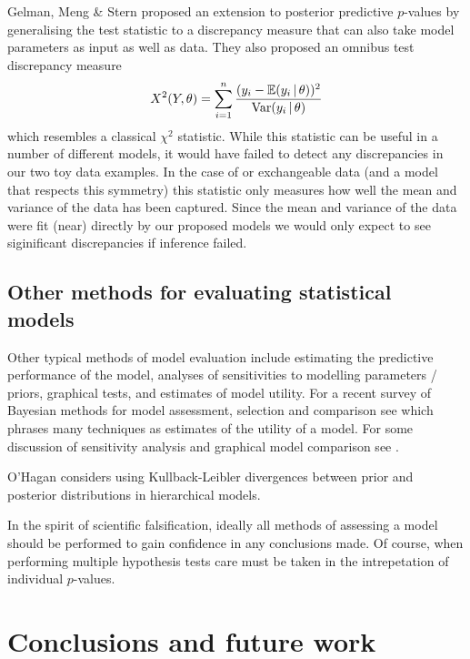 \documentclass{article} %
\begin{document}
Gelman, Meng \& Stern \citep{Gelman1996-ez} proposed an extension to posterior predictive $p$-values by generalising the test statistic to a discrepancy measure that can also take model parameters as input as well as data.
They also proposed an omnibus test discrepancy measure
\begin{equation}
  X^2(Y,\theta) = \sum_{i=1}^n \frac{(y_i-\mathbb{E}(y_i\,|\,\theta))^2}{\textrm{Var}(y_i\,|\,\theta)}
\end{equation}
which resembles a classical $\chi^2$ statistic.
While this statistic can be useful in a number of different models, it would have failed to detect any discrepancies in our two toy data examples.
In the case of \iid or exchangeable data (and a model that respects this symmetry) this statistic only measures how well the mean and variance of the data has been captured.
Since the mean and variance of the data were fit (near) directly by our proposed models we would only expect to see siginificant discrepancies if inference failed.

\subsection{Other methods for evaluating statistical models}

Other typical methods of model evaluation include estimating the predictive performance of the model, analyses of sensitivities to modelling parameters / priors, graphical tests, and estimates of model utility.
For a recent survey of Bayesian methods for model assessment, selection and comparison see \cite{Vehtari2012-oh} which phrases many techniques as estimates of the utility of a model.
For some discussion of sensitivity analysis and graphical model comparison see \citep[e.g.][]{Gelman2013-st}.

O'Hagan \citep{OHagan2003-bc} considers using Kullback-Leibler divergences between prior and posterior distributions in hierarchical models.

In the spirit of scientific falsification, ideally all methods of assessing a model should be performed to gain confidence in any conclusions made.
Of course, when performing multiple hypothesis tests care must be taken in the intrepetation of individual $p$-values.

\section{Conclusions and future work}
\end{document}
